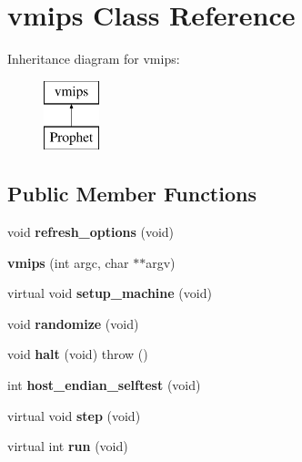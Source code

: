 \hypertarget{classvmips}{
\section{vmips Class Reference}
\label{classvmips}
}
Inheritance diagram for vmips:\begin{figure}[H]
\begin{center}
\leavevmode
\includegraphics[height=2cm]{classvmips}
\end{center}
\end{figure}
\subsection*{Public Member Functions}
\begin{DoxyCompactItemize}
\item 
\hypertarget{classvmips_a637840190b95211ff10a780e03a9e528}{
void {\bfseries refresh\_\-options} (void)}
\label{classvmips_a637840190b95211ff10a780e03a9e528}

\item 
\hypertarget{classvmips_a7b5449e9f0ba819a3a3364222c8d31d3}{
{\bfseries vmips} (int argc, char $\ast$$\ast$argv)}
\label{classvmips_a7b5449e9f0ba819a3a3364222c8d31d3}

\item 
\hypertarget{classvmips_a69ec3a670b86d802f91157dc791b4617}{
virtual void {\bfseries setup\_\-machine} (void)}
\label{classvmips_a69ec3a670b86d802f91157dc791b4617}

\item 
\hypertarget{classvmips_aa8d4ad6d657ddb10b54b6281a31b0a1c}{
void {\bfseries randomize} (void)}
\label{classvmips_aa8d4ad6d657ddb10b54b6281a31b0a1c}

\item 
\hypertarget{classvmips_a59555b31b9b80731838b73a9fb6d9166}{
void {\bfseries halt} (void)  throw ()}
\label{classvmips_a59555b31b9b80731838b73a9fb6d9166}

\item 
\hypertarget{classvmips_a9d9b546b6cdabd0e813dd7cf8e6a9a12}{
int {\bfseries host\_\-endian\_\-selftest} (void)}
\label{classvmips_a9d9b546b6cdabd0e813dd7cf8e6a9a12}

\item 
\hypertarget{classvmips_a6ba4b580d4069985bcac2dfa653bda2c}{
virtual void {\bfseries step} (void)}
\label{classvmips_a6ba4b580d4069985bcac2dfa653bda2c}

\item 
\hypertarget{classvmips_adf103ab6badbdd18cdd22ba98ac8d9f4}{
virtual int {\bfseries run} (void)}
\label{classvmips_adf103ab6badbdd18cdd22ba98ac8d9f4}

\end{DoxyCompactItemize}
